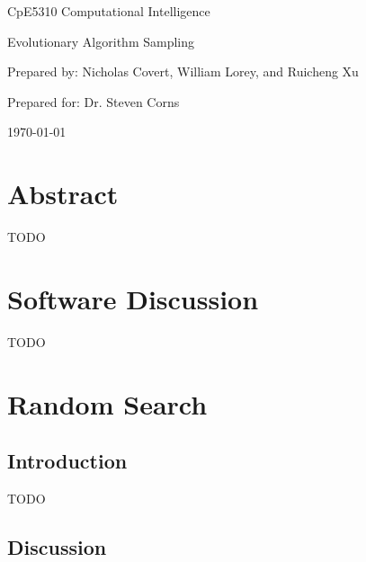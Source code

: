 \documentclass[11pt]{article}
\begin{document}
\thispagestyle{empty}
\begin{center}
\begin{minipage}{0.75\linewidth}
\centering

\vspace{6.2cm}

{\Large CpE5310 Computational Intelligence\par}
\vspace{0.2cm}

{\large Evolutionary Algorithm Sampling\par}
\vspace{3cm}

{\large Prepared by: Nicholas Covert, William Lorey, and Ruicheng Xu\par}
\vspace{0.2cm}

{\large Prepared for: Dr. Steven Corns}
\vspace{3cm}

{\large \today}

\end{minipage}
\end{center}

\clearpage

\tableofcontents

\clearpage


\section{Abstract}

TODO


\section{Software Discussion}

TODO


\section{Random Search}

\subsection{Introduction}

TODO


\subsection{Discussion}
\end{document}
